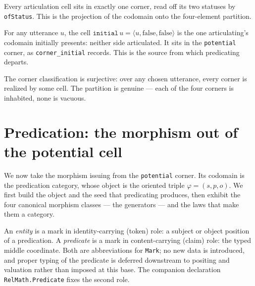 \begin{definition}\label{def:articulation-cell-corner}\leanok{}
Every articulation cell sits in exactly one corner, read off its two statuses by \texttt{ofStatus}. This is the projection of the codomain onto the four-element partition.
\end{definition}

\begin{definition}\label{def:articulation-cell-initial}\leanok{}
For any utterance $u$, the cell $\texttt{initial}\,u = \langle u, \text{false}, \text{false}\rangle$ is the one articulating's codomain initially presents: neither side articulated. It sits in the \texttt{potential} corner, as \texttt{corner\_initial} records. This is the source from which predicating departs.
\end{definition}

\begin{proposition}\label{def:corner-surjective}\leanok{}
The corner classification is surjective: over any chosen utterance, every corner is realized by some cell. The partition is genuine --- each of the four corners is inhabited, none is vacuous.
\end{proposition}

\section{Predication: the morphism out of the potential cell}

We now take the morphism issuing from the \texttt{potential} corner. Its codomain is the predication category, whose object is the oriented triple $\varphi = (s, p, o)$. We first build the object and the seed that predicating produces, then exhibit the four canonical morphism classes --- the generators --- and the laws that make them a category.

\begin{definition}\label{def:entity-predicate}\leanok{}
An \emph{entity} is a mark in identity-carrying (token) role: a subject or object position of a predication. A \emph{predicate} is a mark in content-carrying (claim) role: the typed middle coordinate. Both are abbreviations for \texttt{Mark}; no new data is introduced, and proper typing of the predicate is deferred downstream to positing and valuation rather than imposed at this base. The companion declaration \texttt{RelMath.Predicate} fixes the second role.
\end{definition}


